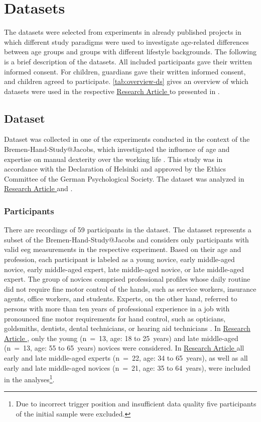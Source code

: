 \section{Datasets}
The datasets were selected from experiments in already published projects in which different study paradigms were used to investigate age-related differences between age groups and groups with different lifestyle backgrounds. The following is a brief description of the datasets. All included participants gave their written informed consent. For children, guardians gave their written informed consent, and children agreed to participate. \autoref{tab:overview-ds} gives an overview of which datasets were used in the respective \hyperref[results:paperI]{Research Article } to \hyperref[results:paperIV]{} presented in .

\subsection{Dataset }
\label{methods:datasets:I}
Dataset  was collected in one of the experiments conducted in the context of the Bremen-Hand-Study@Jacobs, which investigated the influence of age and expertise on manual dexterity over the working life \cite{Voelcker-Rehage2013}. This study was in accordance with the Declaration of Helsinki and approved by the Ethics Committee of the German Psychological Society. The dataset was analyzed in \hyperref[results:paperI]{Research Article } and \hyperref[results:paperIV]{}. 

\subsubsection{Participants}
\label{methods:datasets:I:participants}
There are recordings of 59 participants in the dataset. The datasset represents a subset of the Bremen-Hand-Study@Jacobs and considers only participants with valid \gls{eeg} measurements in the respective experiment. Based on their age and profession, each participant is labeled as a young novice, early middle-aged novice, early middle-aged expert, late middle-aged novice, or late middle-aged expert. The group of novices comprised professional profiles whose daily routine did not require fine motor control of the hands, such as service workers, insurance agents, office workers, and students. Experts, on the other hand, referred to persons with more than ten years of professional experience in a job with pronounced fine motor requirements for hand control, such as opticians, goldsmiths, dentists, dental technicians, or hearing aid technicians \cite{Ericsson1991}. In \hyperref[results:paperI]{Research Article }, only the young (n~=~13, age: 18 to 25~years) and late middle-aged (n~=~13, age: 55 to 65~years) novices were considered. In \hyperref[results:paperIV]{Research Article } all early and late middle-aged experts (n~=~22, age: 34 to 65~years), as well as all early and late middle-aged novices (n~=~21, age: 35 to 64~years), were included in the analyses\footnote{Due to incorrect trigger position and insufficient data quality five participants of the initial sample were excluded.}.

